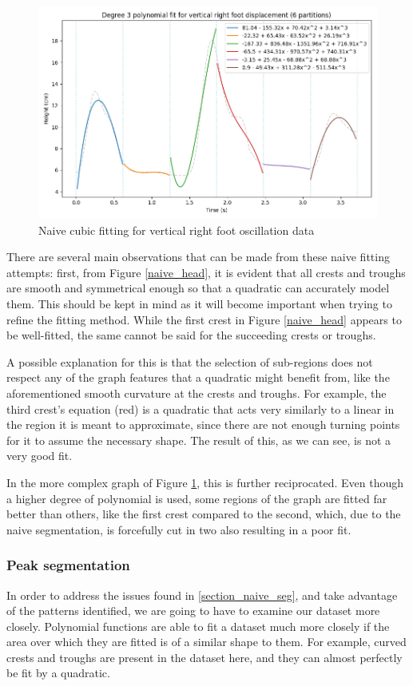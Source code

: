 \documentclass[12pt, a4paper]{article}
\begin{document}
\begin{figure}[H]
    \centering
    \includegraphics[width=12cm]{p_naive_right_3.png}
    \caption{Naive cubic fitting for vertical right foot oscillation data}
    \label{naive_right}
\end{figure}

There are several main observations that can be made from these naive fitting
attempts: first, from Figure \ref{naive_head}, it is evident that all crests and
troughs are smooth and symmetrical enough so that a quadratic can accurately
model them. This should be kept in mind as it will become important when trying
to refine the fitting method. While the first crest in Figure \ref{naive_head}
appears to be well-fitted, the same cannot be said for the succeeding crests or
troughs.

A possible explanation for this is that the selection of sub-regions does not
respect any of the graph features that a quadratic might benefit from, like the
aforementioned smooth curvature at the crests and troughs. For example, the
third crest's equation (red) is a quadratic that acts very similarly to a linear
in the region it is meant to approximate, since there are not enough turning
points for it to assume the necessary shape. The result of this, as we can see,
is not a very good fit.

In the more complex graph of Figure \ref{naive_right}, this is further
reciprocated. Even though a higher degree of polynomial is used, some regions of
the graph are fitted far better than others, like the first crest compared to
the second, which, due to the naive segmentation, is forcefully cut in two also
resulting in a poor fit.

\subsubsection{Peak segmentation}
In order to address the issues found in \ref{section_naive_seg}, and take
advantage of the patterns identified, we are going to have to examine our
dataset more closely. Polynomial functions are able to fit a dataset
much more closely if the area over which they are fitted is of a similar shape
to them. For example, curved crests and troughs are present in the dataset here,
and they can almost perfectly be fit by a quadratic.
\end{document}
